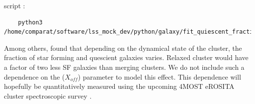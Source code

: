 \documentclass[fleqn,usenatbib,onecolumn]{mnras}
\begin{document}
script :
\begin{verbatim}
    python3 /home/comparat/software/lss_mock_dev/python/galaxy/fit_quiescent_fraction.py
\end{verbatim}


Among others, \citet{2017MNRAS.465.2916S} found that depending on the dynamical state of the cluster, the fraction of star forming and quescient galaxies varies. 
Relaxed cluster would have a factor of two less SF galaxies than merging clusters. 
We do not include such a dependence on the ({\tt $X_{off}$}) parameter to model this effect. 
This dependence will hopefully be quantitatively measured using the upcoming 4MOST eROSITA cluster spectroscopic survey \citep{Finoguenov2019Msngr}. 

% 
% 
\end{document}
